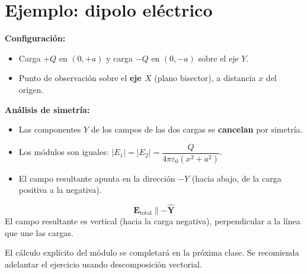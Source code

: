 \documentclass[12pt,a4paper]{article}
\begin{document}
\section{Ejemplo: dipolo eléctrico}

\textbf{Configuración:}
\begin{itemize}[nosep]
  \item Carga $+Q$ en $(0, +a)$ y carga $-Q$ en $(0, -a)$ sobre el eje
        $Y$.
  \item Punto de observación sobre el \textbf{eje $X$} (plano
        bisector), a distancia $x$ del origen.
\end{itemize}

\textbf{Análisis de simetría:}
\begin{itemize}[nosep]
  \item Las componentes $Y$ de los campos de las dos cargas se
        \textbf{cancelan} por simetría.
  \item Los módulos son iguales:
        $|E_1| = |E_2| = \dfrac{Q}{4\pi\varepsilon_0 (x^{2} + a^{2})}$.
  \item El campo resultante apunta en la dirección $-Y$ (hacia abajo,
        de la carga positiva a la negativa).
\end{itemize}



\begin{keybox}
  \[
  \boxed{\mathbf{E}_{\text{total}} \parallel -\hat{\mathbf{Y}}}
  \]
  El campo resultante es vertical (hacia la carga negativa),
  perpendicular a la línea que une las cargas.
\end{keybox}

\begin{notebox}[Tarea]
  El cálculo explícito del módulo se completará en la próxima clase.
  Se recomienda adelantar el ejercicio usando descomposición vectorial.
\end{notebox}
\end{document}
